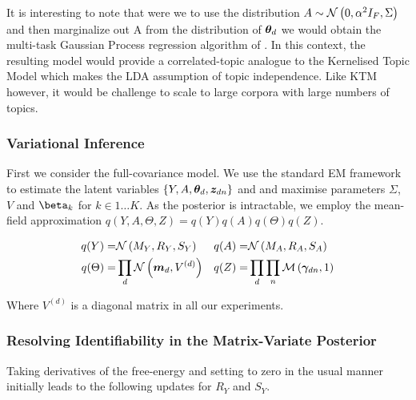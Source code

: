It is interesting to note that were we to use the distribution $A \sim \mathcal{N} \left(0, \alpha^2 I_F, \Sigma\right)$ and then marginalize out A from the distribution of ${ \bm \theta_d }$ we would obtain the multi-task Gaussian Process regression algorithm of \cite{Bonilla2008}. In this context, the resulting model would provide a correlated-topic analogue to the Kernelised Topic Model \cite{Hennig2012} which makes the LDA assumption of topic independence. Like KTM however, it would be challenge to scale to large corpora with large numbers of topics.

\subsubsection{Variational Inference}
\newcommand \onek { \one_K }
\newcommand \md { \vv{m}_d }
\newcommand \Vd { V^{(d)} }


\newcommand \sigmoid[1] { {  \vv{\sigma}\left( #1 \right)  } }
\newcommand \sigmoidk[1] { {  \sigmoidat{#1}{k}  } }
\newcommand \sigmoidat[2] { {  \sigma_{#2}\left( #1 \right)  } }
\newcommand \ged { { \nabla_{\Ed} } }
\newcommand \gesig { { \ged \left[ \sigmoid{\Ed} \right] } }

First we consider the full-covariance model. We use the standard EM framework to estimate the latent variables $\{Y, A, { \bm \theta_d }, { \bm z_{dn} }\}$ and and maximise parameters $\Sigma$, $V$ and $\vv{\beta}_k$ for $k \in 1\ldots K$. As the posterior is intractable, we employ the mean-field approximation $q(Y, A, \Theta, Z) = q(Y)q(A)q(\Theta)q(Z)$. 

\begin{align}
q(Y) = & \mnor{M_Y}{R_Y}{S_Y} & q(A) = & \mnor{M_A}{R_A}{S_A} \\ 
q(\Theta) = & \prod_d \nor{\md}{\Vd} & q(Z) = & \prod_d \prod_n \muln{\vv{\gamma}_{dn}}{1} 
\end{align}


Where $\Vd$ is a diagonal matrix in all our experiments.

\subsubsection{Resolving Identifiability in the Matrix-Variate Posterior}
Taking derivatives of the free-energy and setting to zero in the usual manner initially leads to the following updates for $R_Y$ and $S_Y$.

